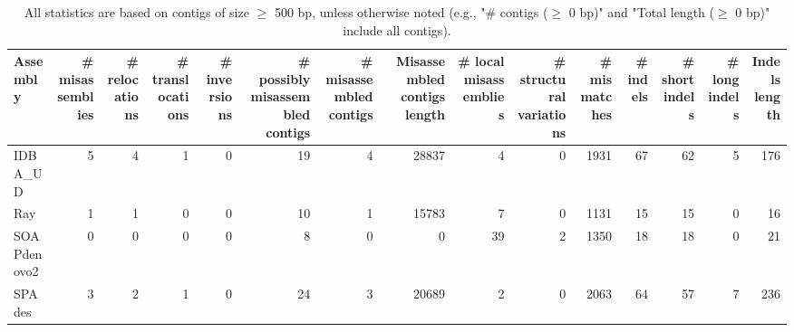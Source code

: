 \documentclass[12pt,a4paper]{article}
\begin{document}
\begin{table}[ht]
\begin{center}
\caption{All statistics are based on contigs of size $\geq$ 500 bp, unless otherwise noted (e.g., "\# contigs ($\geq$ 0 bp)" and "Total length ($\geq$ 0 bp)" include all contigs).}
\begin{tabular}{|l*{14}{|r}|}
\hline
Assembly & \# misassemblies &     \# relocations &     \# translocations &     \# inversions & \# possibly misassembled contigs & \# misassembled contigs & Misassembled contigs length & \# local misassemblies & \# structural variations & \# mismatches & \# indels &     \# short indels &     \# long indels & Indels length \\ \hline
IDBA\_UD & 5 & 4 & 1 & 0 & 19 & 4 & 28837 & 4 & 0 & 1931 & 67 & 62 & 5 & 176 \\ \hline
Ray & 1 & 1 & 0 & 0 & 10 & 1 & 15783 & 7 & 0 & 1131 & 15 & 15 & 0 & 16 \\ \hline
SOAPdenovo2 & 0 & 0 & 0 & 0 & 8 & 0 & 0 & 39 & 2 & 1350 & 18 & 18 & 0 & 21 \\ \hline
SPAdes & 3 & 2 & 1 & 0 & 24 & 3 & 20689 & 2 & 0 & 2063 & 64 & 57 & 7 & 236 \\ \hline
\end{tabular}
\end{center}
\end{table}
\end{document}

